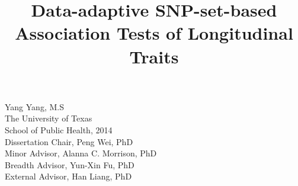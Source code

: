 \documentclass[12pt]{article}
\begin{document}
\newpage
\thispagestyle{empty}
\doublespacing
\begin{titlepage}
\title{\normalsize Data-adaptive SNP-set-based Association Tests of Longitudinal Traits}
\date{}
\maketitle
\begin{center}
\singlespacing
Yang Yang, M.S\\
The University of Texas\\
School of Public Health, 2014\\[3.2cm]




\doublespacing
\noindent
Dissertation Chair, Peng Wei, PhD\\
Minor Advisor, Alanna C. Morrison, PhD\\ 
Breadth Advisor, Yun-Xin Fu, PhD \\
External Advisor, Han Liang, PhD\\

\end{center}
\end{titlepage}


\newpage
\tableofcontents

\newpage
\listoftables

\newpage
\listoffigures
 

\newpage
\end{document}
